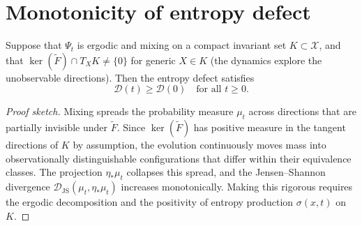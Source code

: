 \documentclass[12pt, oneside]{memoir}
\newcommand{\X}{\mathcal{X}}
\newcommand{\Ft}{\widetilde{F}}
\newcommand{\Djs}{\mathcal{D}_{\mathrm{JS}}}
\begin{document}
\section{Monotonicity of entropy defect}

\begin{theorem}
\label{thm:D-monotone}
Suppose that $\Psi_t$ is ergodic and mixing on a compact invariant set $K \subset \X$,
and that $\ker(\Ft) \cap T_X K \ne \{0\}$ for generic $X \in K$ (the dynamics explore
the unobservable directions).  Then the entropy defect satisfies
\[
  \mathcal{D}(t) \ge \mathcal{D}(0) \quad \text{for all } t \ge 0.
\]
\end{theorem}

\begin{proof}[Proof sketch]
Mixing spreads the probability measure $\mu_t$ across directions that are partially
invisible under $\Ft$.  Since $\ker(\Ft)$ has positive measure in the tangent directions
of $K$ by assumption, the evolution continuously moves mass into observationally
distinguishable configurations that differ within their equivalence classes.
The projection $\eta_*\mu_t$ collapses this spread, and the Jensen--Shannon divergence
$\Djs(\mu_t, \eta_*\mu_t)$ increases monotonically.  Making this rigorous requires
the ergodic decomposition and the positivity of entropy production $\sigma(x,t)$ on $K$.
\end{proof}
\end{document}
